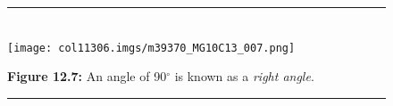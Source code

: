     \setcounter{subfigure}{0}
	\begin{figure}[H] %
    \begin{center}
    \rule[.1in]{\figurerulewidth}{.005in} \\
        \label{m39370*uid18!!!underscore!!!media}\label{m39370*uid18!!!underscore!!!printimage}\texttt{[image: col11306.imgs/m39370\_MG10C13\_007.png]} %
      \vspace{2pt}
    \vspace{\rubberspace}\par \begin{cnxcaption}
	  \small \textbf{Figure 12.7: }An angle of 90${}^{\circ }$ is known as a \textsl{right angle}.
	\end{cnxcaption}
    \vspace{.1in}
    \rule[.1in]{\figurerulewidth}{.005in} \\
    \end{center}
 \end{figure}       
\label{m39370*secfhsst!!!underscore!!!id210}
